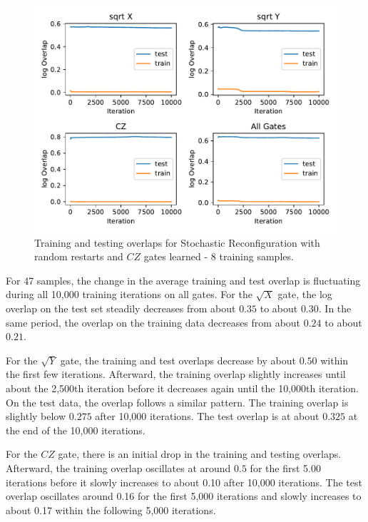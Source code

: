 \begin{figure}[H]
  \centering
  \includegraphics[width=\textwidth]{figures/results/sr-restarts-learned/avgOverlap_8.pdf}
  \caption[Training and Testing Overlaps for Stochastic Reconfiguration with Random Restarts and $CZ$ Gates Learned - 8 Samples]{
  Training and testing overlaps for Stochastic Reconfiguration with random restarts and $CZ$ gates learned - 8 training samples.}
  \label{fig:sr_restarts_overlap_8}
\end{figure}

For 47 samples, the change in the average training and test overlap is fluctuating during all 10,000
training iterations on all gates. For the 
$\sqrt{X}$ gate, the log overlap on the test set steadily decreases from 
about $0.35$ to about $0.30$. In the same period, the overlap on the training data decreases from about $0.24$ to about $0.21$.

For the $\sqrt{Y}$ gate, the training and test overlaps decrease by about $0.50$ within the first few iterations. 
Afterward, the training overlap slightly increases until about the 2,500th iteration before it decreases again 
until the 10,000th iteration. On the test data, the overlap follows a similar pattern. The 
training overlap is slightly below $0.275$ after 10,000 iterations. The test overlap is at about $0.325$ 
at the end of the 10,000 iterations. 

For the $CZ$ gate, there is an initial drop in the training and testing overlaps. Afterward, 
the training overlap oscillates at around $0.5$ for the first 5.00 iterations before it slowly increases to about 
0.10 after 10,000 iterations. The test overlap oscillates around 0.16 for the first 5,000 iterations and 
slowly increases to about 0.17 within the following 5,000 iterations. 

